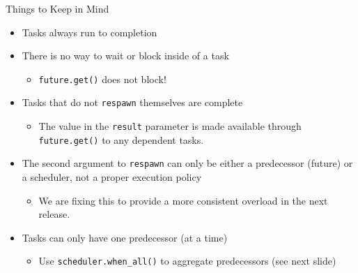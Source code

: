 \begin{frame}[fragile]{Things to Keep in Mind}
  \begin{itemize}
    \item Tasks always run to completion
    \item There is no way to wait or block inside of a task
      \begin{itemize}
        \item {\color{red} \texttt{future.get()} does not block!}
      \end{itemize}
    \item Tasks that do not \texttt{respawn} themselves are complete
      \begin{itemize}
        \item The value in the \texttt{result} parameter is made available through \texttt{future.get()} to any dependent tasks.
      \end{itemize}
    \item The second argument to \texttt{respawn} can only be either a predecessor (future) or a scheduler, not a proper execution policy
      \begin{itemize}
        \item We are fixing this to provide a more consistent overload in the next release.
      \end{itemize}
    \item Tasks can only have one predecessor (at a time)
      \begin{itemize}
        \item Use \texttt{scheduler.when\_all()} to aggregate predecessors (see next slide)
      \end{itemize}
  \end{itemize}
\end{frame}


